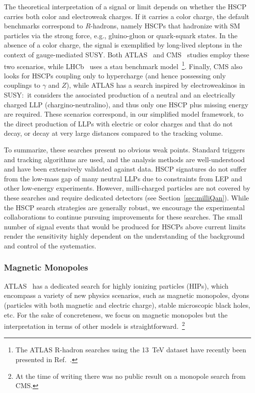 The theoretical interpretation of a signal or limit depends on whether the HSCP carries both color and electroweak charges. If it carries a color charge, the default benchmarks correspond to $R$-hadrons, namely HSCPs that hadronize with SM particles via the strong force, e.g., gluino-gluon or quark-squark states. In the absence of a color charge, the signal is exemplified by long-lived sleptons in the context of gauge-mediated SUSY. Both ATLAS~\cite{ATLAS:2014fka} and CMS~\cite{CMS-PAS-EXO-16-036} studies employ these two scenarios, while LHCb~\cite{Aaij:2015ica} uses a stau benchmark model~\footnote{The ATLAS R-hadron searches using the 13~TeV dataset have recently been presented in Ref.~\cite{Aaboud:2016uth}. }.
Finally, CMS also looks for HSCPs coupling only to hypercharge (and hence possessing only couplings to $\gamma$ and $Z$), while ATLAS has a search inspired by electroweakinos in SUSY:~it considers the associated production of a neutral and an electrically charged LLP (chargino-neutralino), and thus only one HSCP plus missing energy are required. These scenarios correspond, in our simplified model framework, to the direct production of LLPs with electric or color charges and that do not decay, or decay at very large distances compared to the tracking volume.

To summarize, these searches present no obvious weak points. Standard triggers and tracking algorithms are used, and the analysis methods are well-understood and have been extensively validated against data. HSCP signatures do not suffer from the low-mass gap of many neutral LLPs due to constraints from LEP and other low-energy experiments. However, milli-charged particles are not covered by these searches and require dedicated detectors (see Section~\ref{sec:milliQan}). While the HSCP search strategies are generally robust, we encourage the experimental collaborations to continue pursuing improvements for these searches. The small number of signal events that would be produced for HSCPs above current limits render the sensitivity highly dependent on the understanding of the background and control of the systematics.

\subsubsection*{Magnetic Monopoles}

ATLAS~\cite{Aad:2015kta} has a dedicated search for highly ionizing particles (HIPs), which encompass a variety of new physics scenarios, such as magnetic monopoles, dyons (particles with both magnetic and electric charge), stable microscopic black holes, etc. For the sake of concreteness, we focus on magnetic monopoles but the interpretation in terms of other models is straightforward.~\footnote{At the time of writing there was no public result on a monopole search from CMS.}

